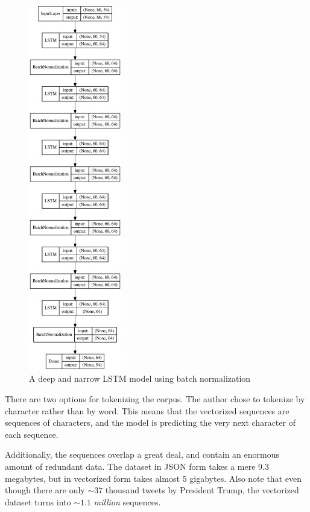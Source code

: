 \documentclass[letterpaper]{article}
\begin{document}
        \begin{figure}
            \centering
            \includegraphics[width=0.36\textwidth]{figures/64x6.eps}
            \caption{A deep and narrow LSTM model using batch normalization}\label{fig:architecture-64x6}
        \end{figure}

        There are two options for tokenizing the corpus. The author chose to tokenize by character rather than by word. This means that the vectorized sequences are sequences of characters, and the model is predicting the very next character of each sequence.

        Additionally, the sequences overlap a great deal, and contain an enormous amount of redundant data. The dataset in JSON form takes a mere 9.3 megabytes, but in vectorized form takes almost 5 gigabytes. Also note that even though there are only $\sim 37$ thousand tweets by President Trump, the vectorized dataset turns into $\sim 1.1$ \textit{million} sequences.
\end{document}
